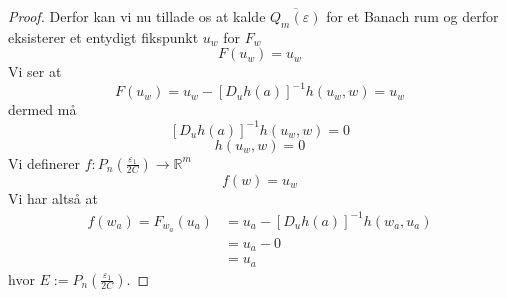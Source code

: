\begin{proof}
   Derfor kan vi nu tillade os at kalde $\overline{Q_m(\varepsilon)}$ for et Banach rum og derfor eksisterer et entydigt fikspunkt $u_w$ for $F_w$
   $$F(u_w) = u_w$$
   Vi ser at
   $$F(u_w) = u_w - [D_uh(a)]^{-1}h(u_w, w) = u_w$$
   dermed må
   $$[D_uh(a)]^{-1}h(u_w, w) = 0 $$
   $$h(u_w, w) = 0$$
   Vi definerer $f:P_n(\frac{\varepsilon_1}{2C}) \rightarrow \mathbb{R}^m$
   $$f(w) = u_w$$
   Vi har altså at
   \begin{align*}
     f(w_a) = F_{w_a}(u_a) &= u_a - [D_uh(a)]^{-1}h(w_a, u_a)\\
     &= u_a - 0 \\
     &= u_a
   \end{align*}
   hvor $E := P_n(\frac{\varepsilon_1}{2C})$.
\end{proof}

%
%
%
%
